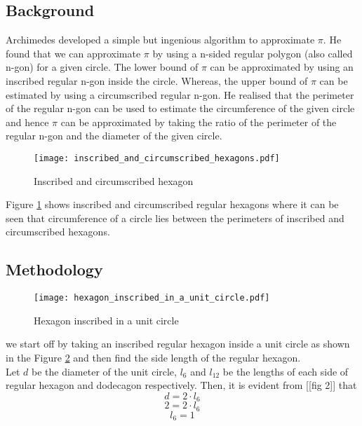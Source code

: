 \documentclass[12pt]{article}
\begin{document}
\subsection{Background}
Archimedes developed a simple but ingenious algorithm to approximate $\pi$. He found that we can approximate $\pi$ by using a n-sided regular polygon (also called n-gon) for a given circle. The lower bound of $\pi$ can be approximated by using an inscribed regular n-gon inside the circle. Whereas, the upper bound of $\pi$ can be estimated by using a circumscribed regular n-gon. He realised that the perimeter of the regular n-gon can be used to estimate the circumference of the given circle and hence $\pi$ can be approximated by taking the ratio of the perimeter of the regular n-gon and the diameter of the given circle.\\

\begin{figure}[h!]
  \texttt{[image: inscribed\_and\_circumscribed\_hexagons.pdf]}
  \caption{Inscribed and circumscribed hexagon}
  \label{fig:ics}
\end{figure}
Figure \ref{fig:ics} shows inscribed and circumscribed regular hexagons where it can be seen that circumference of a circle lies between the perimeters of inscribed and circumscribed hexagons.\\
\bigskip

\subsection{Methodology}

\begin{figure}[h!]
  \texttt{[image: hexagon\_inscribed\_in\_a\_unit\_circle.pdf]}
  \caption{Hexagon inscribed in a unit circle}
  \label{fig:hiuc}
\end{figure}

we start off by taking an inscribed regular hexagon inside a unit circle as shown in the Figure \ref{fig:hiuc} and then find the side length of the regular hexagon. \\

Let $d$ be the diameter of the unit circle, $l_{6}$ and $l_{12}$ be the lengths of each side of regular hexagon and dodecagon respectively.
Then, it is evident from [[fig 2]] that\\
$$d = 2 \cdot l_{6}$$
$$2 = 2 \cdot l_{6}$$
$$l_{6} = 1$$
\bigskip
\end{document}
